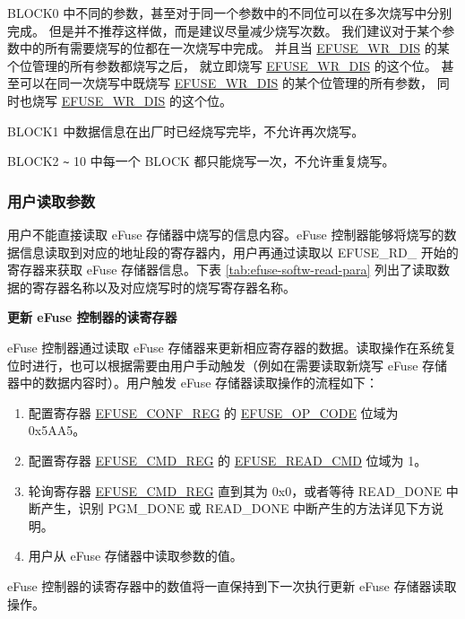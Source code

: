 \documentclass[main\_\_CN.tex]{subfiles}
\begin{document}
BLOCK0 中不同的参数，甚至对于同一个参数中的不同位可以在多次烧写中分别完成。
但是并不推荐这样做，而是建议尽量减少烧写次数。
我们建议对于某个参数中的所有需要烧写的位都在一次烧写中完成。
并且当 \hyperref[fielddesc:EFUSEWRDIS]{EFUSE\_WR\_DIS} 的某个位管理的所有参数都烧写之后，
就立即烧写 \hyperref[fielddesc:EFUSEWRDIS]{EFUSE\_WR\_DIS} 的这个位。
甚至可以在同一次烧写中既烧写 \hyperref[fielddesc:EFUSEWRDIS]{EFUSE\_WR\_DIS} 的某个位管理的所有参数，
同时也烧写 \hyperref[fielddesc:EFUSEWRDIS]{EFUSE\_WR\_DIS} 的这个位。

BLOCK1 中数据信息在出厂时已经烧写完毕，不允许再次烧写。

BLOCK2 \verb+~+ 10 中每一个 BLOCK 都只能烧写一次，不允许重复烧写。

\subsubsection{用户读取参数}
\label{sec:efuse-software-read-para}

用户不能直接读取 eFuse 存储器中烧写的信息内容。eFuse 控制器能够将烧写的数据信息读取到对应的地址段的寄存器内，用户再通过读取以 EFUSE\_RD\_ 开始的寄存器来获取 eFuse 存储器信息。下表 \ref{tab:efuse-softw-read-para} 列出了读取数据的寄存器名称以及对应烧写时的烧写寄存器名称。



{\bfseries 更新 eFuse 控制器的读寄存器}
\label{sec:efuse-update-reg}

eFuse 控制器通过读取 eFuse 存储器来更新相应寄存器的数据。读取操作在系统复位时进行，也可以根据需要由用户手动触发（例如在需要读取新烧写 eFuse 存储器中的数据内容时）。用户触发 eFuse 存储器读取操作的流程如下：
\begin{enumerate}
    \item 配置寄存器 \hyperref[regdesc:EFUSECONFREG]{EFUSE\_CONF\_REG} 的 \hyperref[fielddesc:EFUSEOPCODE]{EFUSE\_OP\_CODE} 位域为 0x5AA5。
    \item 配置寄存器 \hyperref[regdesc:EFUSECMDREG]{EFUSE\_CMD\_REG} 的 \hyperref[fielddesc:EFUSEREADCMD]{EFUSE\_READ\_CMD} 位域为 1。
    \item 轮询寄存器 \hyperref[regdesc:EFUSECMDREG]{EFUSE\_CMD\_REG} 直到其为 0x0，或者等待 READ\_DONE 中断产生，识别 PGM\_DONE 或 READ\_DONE 中断产生的方法详见下方说明。
    \item 用户从 eFuse 存储器中读取参数的值。
\end{enumerate}
eFuse 控制器的读寄存器中的数值将一直保持到下一次执行更新 eFuse 存储器读取操作。
\end{document}
